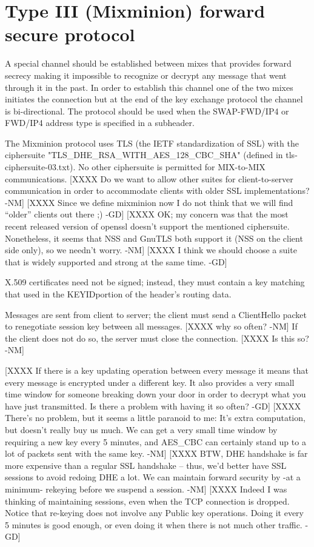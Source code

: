 \section{Type III (Mixminion) forward secure protocol}

A special channel should be established between mixes that provides
forward secrecy making it impossible to recognize or decrypt any
message that went through it in the past. In order to establish this
channel one of the two mixes initiates the connection but at the end
of the key exchange protocol the channel is bi-directional. The
protocol should be used when the SWAP-FWD/IP4 or FWD/IP4 address type
is specified in a subheader.

The Mixminion protocol uses TLS (the IETF standardization of SSL) with
the ciphersuite "TLS_DHE_RSA_WITH_AES_128_CBC_SHA" (defined in
tls-ciphersuite-03.txt).  No other ciphersuite is permitted for
MIX-to-MIX communications.
[XXXX Do we want to allow other suites for client-to-server
      communication in order to accommodate clients with older SSL
      implementations? -NM]
[XXXX Since we define mixminion now I do not think that we will find
      ``older'' clients out there ;) -GD]
[XXXX OK; my concern was that the most recent released version of
      openssl doesn't support the mentioned ciphersuite.  Nonetheless,
      it seems that NSS and GnuTLS both support it (NSS on the client
      side only), so we needn't worry. -NM]  
[XXXX I think we should choose a suite that is widely supported and
      strong at the same time. -GD]

X.509 certificates need not be signed; instead, they must contain
a key matching that used in the KEYIDportion of the header's routing
data.  

Messages are sent from client to server; the client must send a
ClientHello packet to renegotiate session key between all
messages. [XXXX why so often? -NM] If the client does not do so, the
server must close the connection.  [XXXX Is this so? -NM]

[XXXX If there is a key updating operation between every message it means
that every message is encrypted under a different key. It also
provides a very small time window for someone breaking down your door
in order to decrypt what you have just transmitted. Is there a problem
with having it so often? -GD]
[XXXX There's no problem, but it seems a little paranoid to me: It's
extra computation, but doesn't really buy us much.  We can get a very
small time window by requiring a new key every 5 minutes, and AES_CBC
can certainly stand up to a lot of packets sent with the same
key. -NM]
[XXXX BTW, DHE handshake is far more expensive than a regular SSL
handshake -- thus, we'd better have SSL sessions to avoid redoing DHE
a lot.  We can maintain forward security by -at a minimum- rekeying
before we suspend a session. -NM]
[XXXX Indeed I was thinking of maintaining sessions, even when the TCP
connection is dropped. Notice that re-keying does not involve any
Public key operations. Doing it every 5 minutes is good enough, or
even doing it when there is not much other traffic. -GD]

